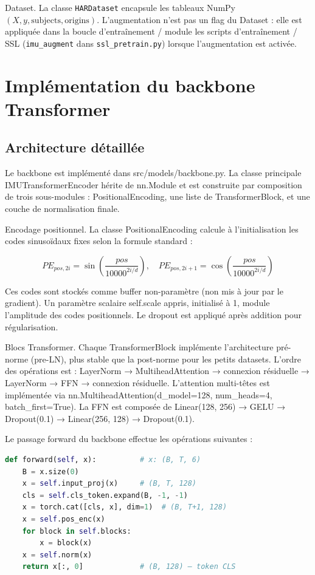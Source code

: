 Dataset. La classe \texttt{HARDataset} encapsule les tableaux NumPy
$(X, y, \mathrm{subjects}, \mathrm{origins})$. L'augmentation n'est pas un
flag du Dataset : elle est appliquée dans la boucle d'entraînement / module
les scripts d'entraînement / SSL (\texttt{imu\_augment} dans \texttt{ssl\_pretrain.py}) lorsque l'augmentation est activée.

\section{Implémentation du backbone Transformer}

\subsection{Architecture détaillée}

Le backbone est implémenté dans src/models/backbone.py. La classe principale IMUTransformerEncoder hérite de nn.Module et est construite par composition de trois sous-modules : PositionalEncoding, une liste de TransformerBlock, et une couche de normalisation finale.

Encodage positionnel. La classe PositionalEncoding calcule à l'initialisation les codes sinusoïdaux fixes selon la formule standard :

$$PE_{pos, 2i} = \sin\left(\frac{pos}{10000^{2i/d}}\right), \quad PE_{pos, 2i+1} = \cos\left(\frac{pos}{10000^{2i/d}}\right)$$

Ces codes sont stockés comme buffer non-paramètre (non mis à jour par le gradient). Un paramètre scalaire self.scale appris, initialisé à 1, module l'amplitude des codes positionnels. Le dropout est appliqué après addition pour régularisation.

Blocs Transformer. Chaque TransformerBlock implémente l'architecture pré-norme (pre-LN), plus stable que la post-norme pour les petits datasets. L'ordre des opérations est : LayerNorm → MultiheadAttention → connexion résiduelle → LayerNorm → FFN → connexion résiduelle. L'attention multi-têtes est implémentée via nn.MultiheadAttention(d\_model=128, num\_heads=4, batch\_first=True). La FFN est composée de Linear(128, 256) → GELU → Dropout(0.1) → Linear(256, 128) → Dropout(0.1).

Le passage forward du backbone effectue les opérations suivantes :

\begin{lstlisting}[language=Python,caption={Forward pass du backbone},label=lst:backbone_forward]
def forward(self, x):          # x: (B, T, 6)
    B = x.size(0)
    x = self.input_proj(x)     # (B, T, 128)
    cls = self.cls_token.expand(B, -1, -1)
    x = torch.cat([cls, x], dim=1)  # (B, T+1, 128)
    x = self.pos_enc(x)
    for block in self.blocks:
        x = block(x)
    x = self.norm(x)
    return x[:, 0]             # (B, 128) — token CLS
\end{lstlisting}

